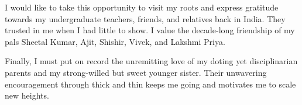 \begin{acknowledgments}
  I would like to take this opportunity to visit my roots and express gratitude
  towards my undergraduate teachers, friends, and relatives back in India.
  They trusted in me when I had little to show.  I value the decade-long
  friendship of my pals Sheetal Kumar, Ajit, Shishir, Vivek, and Lakshmi Priya.

  Finally, I must put on record the unremitting love of my doting yet
  disciplinarian parents and my strong-willed but sweet younger sister.
  Their unwavering encouragement through thick and thin keeps me
  going and motivates me to scale new heights.

\end{acknowledgments}
